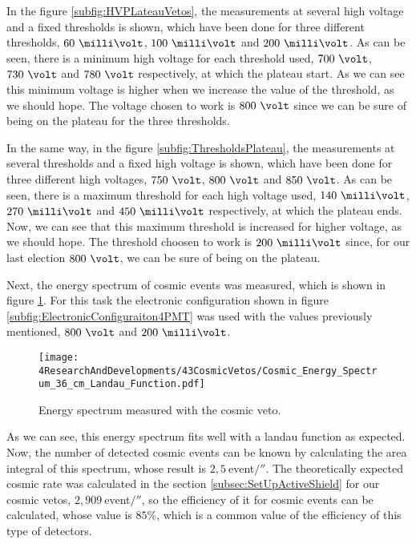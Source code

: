 In the figure \ref{subfig:HVPLateauVetos}, the measurements at several high voltage and a fixed thresholds is shown, which have been done for three different thresholds, $60~\milli\volt$, $100~\milli\volt$ and $200~\milli\volt$. As can be seen, there is a minimum high voltage for each threshold used, $700~\volt$, $730~\volt$ and $780~\volt$ respectively, at which the plateau start. As we can see this minimum voltage is higher when we increase the value of the threshold, as we should hope. The voltage chosen to work is $800~\volt$ since we can be sure of being on the plateau for the three thresholds.

In the same way, in the figure \ref{subfig:ThresholdsPlateau}, the measurements at several thresholds and a fixed high voltage is shown, which have been done for three different high voltages, $750~\volt$, $800~\volt$ and $850~\volt$. As can be seen, there is a maximum threshold for each high voltage used,  $140~\milli\volt$, $270~\milli\volt$ and $450~\milli\volt$ respectively, at which the plateau ends. Now, we can see that this maximum threshold is increased for higher voltage, as we should hope. The threshold choosen to work is $200~\milli\volt$ since, for our last election $800~\volt$, we can be sure of being on the plateau. 

Next, the energy spectrum of cosmic events was measured, which is shown in figure \ref{fig:EnergySpectrumCosmicVeto}. For this task the electronic configuration shown in figure \ref{subfig:ElectronicConfiguraiton4PMT} was used with the values previously mentioned, $800~\volt$ and $200~\milli\volt$. 

\begin{figure}[h]
\centering
\texttt{[image: 4ResearchAndDevelopments/43CosmicVetos/Cosmic\_Energy\_Spectrum\_36\_cm\_Landau\_Function.pdf]}
\caption{Energy spectrum measured with the cosmic veto.\label{fig:EnergySpectrumCosmicVeto}}
\end{figure}

As we can see, this energy spectrum fits well with a landau function as expected. Now, the number of detected cosmic events can be known by calculating the area integral of this spectrum, whose result is $2,5~$event$/\second$. The theoretically expected cosmic rate was calculated in the section \ref{subsec:SetUpActiveShield} for our cosmic vetos, $2,909~$event$/\second$, so the efficiency of it for cosmic events can be calculated, whose value is $85\%$, which is a common value of the efficiency of this type of detectors.


